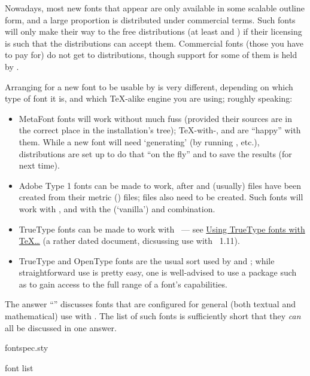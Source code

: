 Nowadays, most new fonts that appear are only available in some
scalable outline form, and a large proportion is distributed under
commercial terms.  Such fonts will only make their way to the free
distributions (at least \texlive{} and \miktex{}) if their licensing
is such that the distributions can accept them.  Commercial fonts
(those you have to pay for) do not get to distributions, though
support for some of them is held by .

Arranging for a new font to be usable by \alltex{} is very different,
depending on which type of font it is, and which \TeX{}-alike engine
you are using; roughly speaking:
\begin{itemize}
\item MetaFont fonts will work without much fuss (provided their
  sources are in the correct place in the installation's tree);
  \TeX{}-with-, and \pdftex{} are ``happy'' with them.
  While a new font will need `generating' (by running \mf{}, etc.),
  distributions are set up to do that ``on the fly'' and to save the
  results (for next time).
\item Adobe Type 1 fonts can be made to work, after 
  and (usually)  files have been created from their
  metric () files;  files also need to
  be created.  Such fonts will work with \pdftex{}, and with the
  (`vanilla')\alltex{} and  combination.
\item TrueType fonts can be made to work with \pdftex{}~--- see
\href{http://www.radamir.com/tex/ttf-tex.htm}{Using TrueType fonts with \TeX{}\dots{}}
  (a rather dated document, dicsussing use with \miktex{}~1.11).
\item TrueType and OpenType fonts are the usual sort used by \xetex{}
  and \LuaTeX{}; while straightforward use is pretty easy, one is
  well-advised to use a package such as  to gain
  access to the full range of a font's capabilities.
\end{itemize}

The answer ``'' discusses
fonts that are configured for general (both textual and mathematical)
use with \AllTeX{}.  The list of such fonts is sufficiently short that
they \emph{can} all be discussed in one answer.
\begin{ctanrefs}
\item[fontspec.sty]
\item[\nothtml{\rmfamily}\MF{} font list]
\end{ctanrefs}

